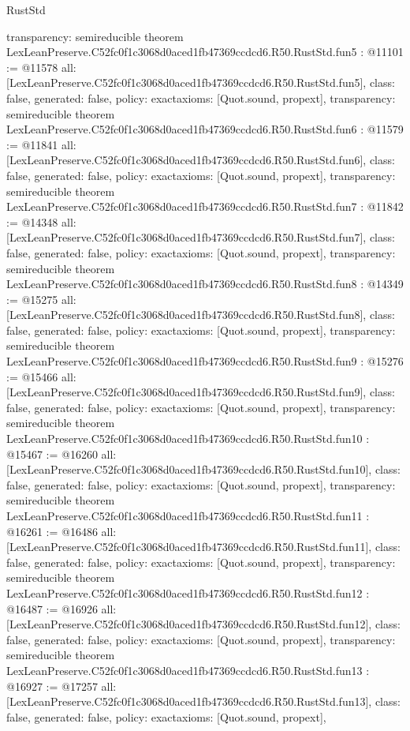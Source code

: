 \begin{lexlean}{RustStd}
\begin{coremodule}
{  transparency: semireducible
}
theorem LexLeanPreserve.C52fc0f1c3068d0aced1fb47369ccdcd6.R50.RustStd.fun5 : @11101 := @11578 {
  all: [LexLeanPreserve.C52fc0f1c3068d0aced1fb47369ccdcd6.R50.RustStd.fun5],
  class: false,
  generated: false,
  policy: exact{axioms: [Quot.sound, propext]},
  transparency: semireducible
}
theorem LexLeanPreserve.C52fc0f1c3068d0aced1fb47369ccdcd6.R50.RustStd.fun6 : @11579 := @11841 {
  all: [LexLeanPreserve.C52fc0f1c3068d0aced1fb47369ccdcd6.R50.RustStd.fun6],
  class: false,
  generated: false,
  policy: exact{axioms: [Quot.sound, propext]},
  transparency: semireducible
}
theorem LexLeanPreserve.C52fc0f1c3068d0aced1fb47369ccdcd6.R50.RustStd.fun7 : @11842 := @14348 {
  all: [LexLeanPreserve.C52fc0f1c3068d0aced1fb47369ccdcd6.R50.RustStd.fun7],
  class: false,
  generated: false,
  policy: exact{axioms: [Quot.sound, propext]},
  transparency: semireducible
}
theorem LexLeanPreserve.C52fc0f1c3068d0aced1fb47369ccdcd6.R50.RustStd.fun8 : @14349 := @15275 {
  all: [LexLeanPreserve.C52fc0f1c3068d0aced1fb47369ccdcd6.R50.RustStd.fun8],
  class: false,
  generated: false,
  policy: exact{axioms: [Quot.sound, propext]},
  transparency: semireducible
}
theorem LexLeanPreserve.C52fc0f1c3068d0aced1fb47369ccdcd6.R50.RustStd.fun9 : @15276 := @15466 {
  all: [LexLeanPreserve.C52fc0f1c3068d0aced1fb47369ccdcd6.R50.RustStd.fun9],
  class: false,
  generated: false,
  policy: exact{axioms: [Quot.sound, propext]},
  transparency: semireducible
}
theorem LexLeanPreserve.C52fc0f1c3068d0aced1fb47369ccdcd6.R50.RustStd.fun10 : @15467 := @16260 {
  all: [LexLeanPreserve.C52fc0f1c3068d0aced1fb47369ccdcd6.R50.RustStd.fun10],
  class: false,
  generated: false,
  policy: exact{axioms: [Quot.sound, propext]},
  transparency: semireducible
}
theorem LexLeanPreserve.C52fc0f1c3068d0aced1fb47369ccdcd6.R50.RustStd.fun11 : @16261 := @16486 {
  all: [LexLeanPreserve.C52fc0f1c3068d0aced1fb47369ccdcd6.R50.RustStd.fun11],
  class: false,
  generated: false,
  policy: exact{axioms: [Quot.sound, propext]},
  transparency: semireducible
}
theorem LexLeanPreserve.C52fc0f1c3068d0aced1fb47369ccdcd6.R50.RustStd.fun12 : @16487 := @16926 {
  all: [LexLeanPreserve.C52fc0f1c3068d0aced1fb47369ccdcd6.R50.RustStd.fun12],
  class: false,
  generated: false,
  policy: exact{axioms: [Quot.sound, propext]},
  transparency: semireducible
}
theorem LexLeanPreserve.C52fc0f1c3068d0aced1fb47369ccdcd6.R50.RustStd.fun13 : @16927 := @17257 {
  all: [LexLeanPreserve.C52fc0f1c3068d0aced1fb47369ccdcd6.R50.RustStd.fun13],
  class: false,
  generated: false,
  policy: exact{axioms: [Quot.sound, propext]},
}
\end{coremodule}
\end{lexlean}
